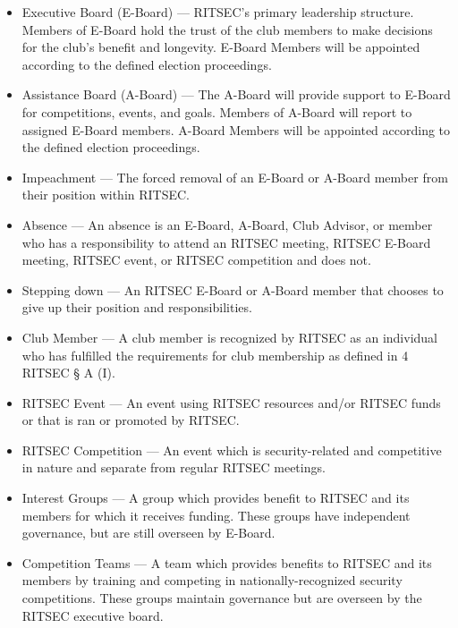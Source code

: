 \begin{itemize}
      \item Executive Board (E-Board) --- RITSEC's primary leadership structure. Members of
            E-Board hold the trust of the club members to make decisions for the club's
            benefit and longevity. E-Board Members will be appointed according to the
            defined election proceedings.

      \item Assistance Board (A-Board) --- The A-Board will provide support to E-Board for
            competitions, events, and goals. Members of A-Board will report to assigned
            E-Board members. A-Board Members will be appointed according to the defined
            election proceedings.

      \item Impeachment --- The forced removal of an E-Board or A-Board member from their
            position within RITSEC\@.

      \item Absence --- An absence is an E-Board, A-Board, Club Advisor, or member who has
            a responsibility to attend an RITSEC meeting, RITSEC E-Board meeting, RITSEC
            event, or RITSEC competition and does not.

      \item Stepping down --- An RITSEC E-Board or A-Board member that chooses to give up
            their position and responsibilities.

      \item Club Member --- A club member is recognized by RITSEC as an individual who has
            fulfilled the requirements for club membership as defined in 4 RITSEC § A (I).

      \item RITSEC Event --- An event using RITSEC resources and/or RITSEC funds or that is
            ran or promoted by RITSEC\@.

      \item RITSEC Competition --- An event which is security-related and competitive in
            nature and separate from regular RITSEC meetings.

      \item Interest Groups --- A group which provides benefit to RITSEC and its members
            for which it receives funding. These groups have independent governance, but
            are still overseen by E-Board.

      \item Competition Teams --- A team which provides benefits to RITSEC and its members
            by training and competing in nationally-recognized security competitions. These 
            groups maintain governance but are overseen by the RITSEC executive board.


\end{itemize}
